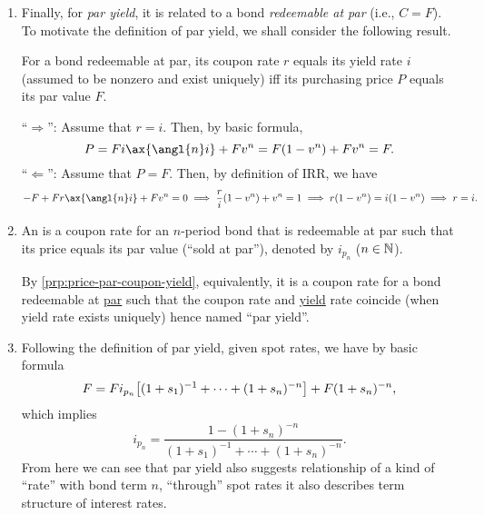 \begin{enumerate}
\item Finally, for \emph{par yield}, it is related to a bond \emph{redeemable
at par} (i.e., \(C=F\)). To motivate the definition of par yield, we shall
consider the following result.
\begin{proposition}
\label{prp:price-par-coupon-yield}
For a bond redeemable at par, its coupon rate \(r\) equals its yield rate \(i\)
(assumed to be nonzero and exist uniquely) iff its purchasing price \(P\)
equals its par value \(F\).
\end{proposition}
\begin{pf}
``\(\Rightarrow\)'': Assume that \(r=i\). Then, by basic formula,
\[
P=Fi\ax{\angl{n}i}+Fv^n
=F(1-v^n)+Fv^n=F.
\]
``\(\Leftarrow\)'': Assume that \(P=F\). Then, by definition of IRR, we have
\[
-F+Fr\ax{\angl{n}i}+Fv^n=0\implies 
\frac{r}{i}(1-v^n)+v^n=1
\implies r(1-v^n)=i(1-v^n)
\implies r=i.
\]
\end{pf}
\item An  is a coupon rate for an \(n\)-period
bond that is redeemable at par such that its price equals its par value (``sold
at par''), denoted by \(i_{p_n}\) (\(n\in\mathbb{N}\)).

\begin{note}
By \cref{prp:price-par-coupon-yield}, equivalently, it is a coupon rate for a
bond redeemable at \underline{par} such that the coupon rate and
\underline{yield} rate coincide (when yield rate exists uniquely)
 hence named ``par yield''.
\end{note}

\item Following the definition of par yield, given spot rates, we have by
basic formula
\[
F=Fi_{p_n}\qty[(1+s_1)^{-1}+\dotsb+(1+s_n)^{-n}]+F(1+s_n)^{-n},
\]
which implies
\[
i_{p_n}=\frac{1-(1+s_{n})^{-n}}{(1+s_1)^{-1}+\dotsb+(1+s_n)^{-n}}.
\]
From here we can see that par yield also suggests relationship of a kind of
``rate'' with bond term \(n\), ``through'' spot rates  it
also describes term structure of interest rates.
\end{enumerate}
